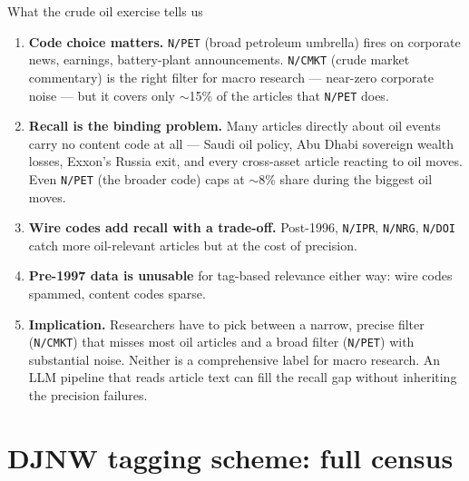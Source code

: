 \documentclass[10pt,aspectratio=169]{beamer}
\begin{document}
\begin{frame}{What the crude oil exercise tells us}
  \footnotesize
  \begin{enumerate}
    \item \textbf{Code choice matters.} \texttt{N/PET} (broad petroleum
          umbrella) fires on corporate news, earnings, battery-plant
          announcements. \texttt{N/CMKT} (crude market commentary) is
          the right filter for macro research --- near-zero corporate
          noise --- but it covers only $\sim$15\% of the articles that
          \texttt{N/PET} does.
    \item \textbf{Recall is the binding problem.} Many articles directly
          about oil events carry no content code at all --- Saudi oil
          policy, Abu Dhabi sovereign wealth losses, Exxon's Russia exit,
          and every cross-asset article reacting to oil moves. Even
          \texttt{N/PET} (the broader code) caps at $\sim$8\% share
          during the biggest oil moves.
    \item \textbf{Wire codes add recall with a trade-off.} Post-1996,
          \texttt{N/IPR}, \texttt{N/NRG}, \texttt{N/DOI} catch more
          oil-relevant articles but at the cost of precision.
    \item \textbf{Pre-1997 data is unusable} for tag-based relevance
          either way: wire codes spammed, content codes sparse.
    \item \textbf{Implication.} Researchers have to pick between a narrow,
          precise filter (\texttt{N/CMKT}) that misses most oil articles
          and a broad filter (\texttt{N/PET}) with substantial noise.
          Neither is a comprehensive label for macro research. An LLM
          pipeline that reads article text can fill the recall gap without
          inheriting the precision failures.
  \end{enumerate}
\end{frame}

\section{DJNW tagging scheme: full census}
\end{document}

